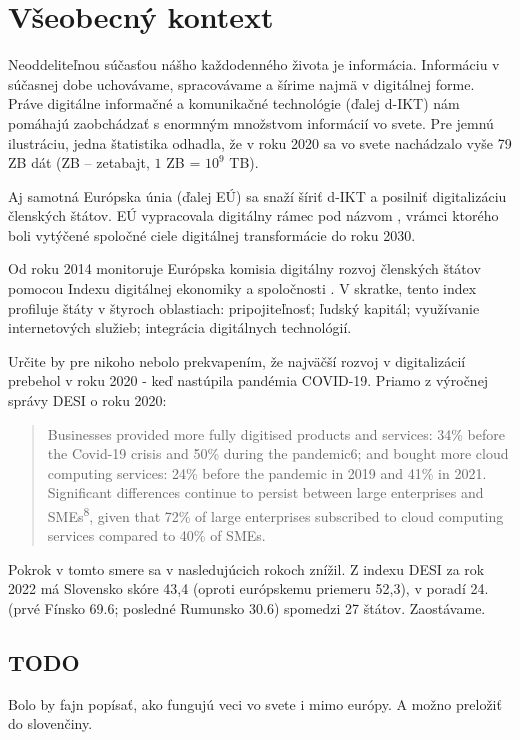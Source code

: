\chapter{Všeobecný kontext}
Neoddeliteľnou súčasťou nášho každodenného života je informácia. Informáciu v súčasnej dobe uchovávame, spracovávame a 
šírime najmä v digitálnej forme. Práve digitálne informačné a komunikačné technológie (ďalej d-IKT) nám pomáhajú 
zaobchádzať s enormným množstvom informácií vo svete. Pre jemnú ilustráciu, jedna štatistika \cite{STATISTA} odhadla, 
že v roku 2020 sa vo svete nachádzalo vyše 79 ZB dát (ZB -- zetabajt, $1$ ZB = $10^9$ TB).


Aj samotná Európska únia (ďalej EÚ) sa snaží šíriť d-IKT a posilniť digitalizáciu členských štátov. EÚ vypracovala
digitálny rámec pod názvom , vrámci ktorého boli vytýčené spoločné ciele digitálnej 
transformácie do roku 2030.

Od roku 2014 monitoruje Európska komisia digitálny rozvoj členských štátov pomocou Indexu digitálnej ekonomiky a
spoločnosti
\cite{DESI22}. V skratke, tento index profiluje štáty v štyroch oblastiach: pripojiteľnosť; ľudský kapitál; 
využívanie internetových služieb; integrácia digitálnych technológií.

Určite by pre nikoho nebolo prekvapením, že najväčší rozvoj v digitalizácií prebehol v roku 2020 - keď nastúpila pandémia COVID-19.
Priamo z výročnej správy DESI\cite{DESI22} o roku 2020:
\begin{quote}
  Businesses provided more fully digitised products and
  services: 34\% before the Covid-19 crisis and 50\% during the pandemic6; and bought more cloud
  computing services: 24\% before the pandemic in 2019 and 41\% in 2021. Significant differences
  continue to persist between large enterprises and SMEs\textsuperscript{8}, given that 72\% of large enterprises
  subscribed to cloud computing services compared to 40\% of SMEs.
\end{quote}

Pokrok v tomto smere sa v nasledujúcich rokoch znížil. Z indexu DESI\cite{DESI22} za rok 2022  má Slovensko skóre 43,4
(oproti európskemu priemeru 52,3), v poradí 24. (prvé Fínsko 69.6; posledné Rumunsko 30.6) spomedzi 27 štátov. Zaostávame.

\section*{TODO} 
Bolo by fajn popísať, ako fungujú veci vo svete i mimo európy. A možno preložiť do slovenčiny.



